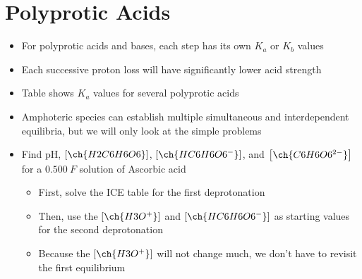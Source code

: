 \documentclass[12pt, openany, letterpaper]{memoir}
\begin{document}
\section{Polyprotic Acids}
\begin{itemize}
  \item For polyprotic acids and bases, each step has its own $K_a$ or $K_b$ values
	\item Each successive proton loss will have significantly lower acid strength
	\item Table  shows $K_a$ values for several polyprotic acids
	\item Amphoteric species can establish multiple simultaneous and interdependent equilibria, but we will only look at the simple problems
	\item Find pH, $\left[\ch{H2C6H6O6}\right]$, $\left[\ch{HC6H6O6^-}\right]$, and  $\left[\ch{C6H6O6^{2-}}\right]$ for a $0.500~F$ solution of Ascorbic acid
	\begin{itemize}
		\item First, solve the ICE table for the first deprotonation
		\item Then, use the $\left[\ch{H3O^+}\right]$ and $\left[\ch{HC6H6O6^-}\right]$ as starting values for the second deprotonation
		\item Because the $\left[\ch{H3O^+}\right]$ will not change much, we don't have to revisit the first equilibrium
	\end{itemize}
\end{itemize}
\end{document}
